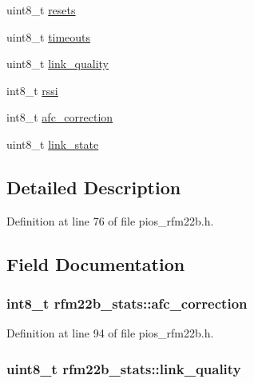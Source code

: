\begin{DoxyCompactItemize}
uint8\-\_\-t \hyperlink{structrfm22b__stats_a8d5014c62b137509e9a5a51fe9e1acae}{resets}
\item 
uint8\-\_\-t \hyperlink{structrfm22b__stats_ae710ec372ffa9365a23fcd2d8f9f8e0e}{timeouts}
\item 
uint8\-\_\-t \hyperlink{structrfm22b__stats_a8d32fed579e3be2fbc354ab176670af2}{link\-\_\-quality}
\item 
int8\-\_\-t \hyperlink{structrfm22b__stats_af292c65ed2be928fd2c5e4639c2cf025}{rssi}
\item 
int8\-\_\-t \hyperlink{structrfm22b__stats_a5e40de4c13a984c6342307cb88d33675}{afc\-\_\-correction}
\item 
uint8\-\_\-t \hyperlink{structrfm22b__stats_aff1fd3341c07dab52a2a666cb6d7ddd4}{link\-\_\-state}
\end{DoxyCompactItemize}


\subsection{\-Detailed \-Description}


\-Definition at line 76 of file pios\-\_\-rfm22b.\-h.



\subsection{\-Field \-Documentation}
\hypertarget{structrfm22b__stats_a5e40de4c13a984c6342307cb88d33675}{
\subsubsection[{afc\-\_\-correction}]{\setlength{\rightskip}{0pt plus 5cm}int8\-\_\-t {\bf rfm22b\-\_\-stats\-::afc\-\_\-correction}}}\label{structrfm22b__stats_a5e40de4c13a984c6342307cb88d33675}


\-Definition at line 94 of file pios\-\_\-rfm22b.\-h.

\hypertarget{structrfm22b__stats_a8d32fed579e3be2fbc354ab176670af2}{
\subsubsection[{link\-\_\-quality}]{\setlength{\rightskip}{0pt plus 5cm}uint8\-\_\-t {\bf rfm22b\-\_\-stats\-::link\-\_\-quality}}}\label{structrfm22b__stats_a8d32fed579e3be2fbc354ab176670af2}


